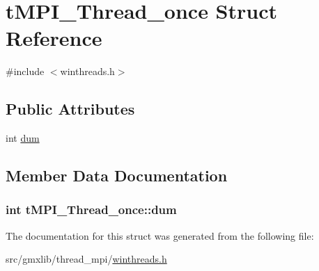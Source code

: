 \hypertarget{structtMPI__Thread__once}{\section{t\-M\-P\-I\-\_\-\-Thread\-\_\-once \-Struct \-Reference}
\label{structtMPI__Thread__once}
}


{\ttfamily \#include $<$winthreads.\-h$>$}

\subsection*{\-Public \-Attributes}
\begin{DoxyCompactItemize}
\item 
int \hyperlink{structtMPI__Thread__once_a55f970772bb7de2e901bfd10170695c4}{dum}
\end{DoxyCompactItemize}


\subsection{\-Member \-Data \-Documentation}
\hypertarget{structtMPI__Thread__once_a55f970772bb7de2e901bfd10170695c4}{
\subsubsection[{dum}]{\setlength{\rightskip}{0pt plus 5cm}int {\bf t\-M\-P\-I\-\_\-\-Thread\-\_\-once\-::dum}}}\label{structtMPI__Thread__once_a55f970772bb7de2e901bfd10170695c4}


\-The documentation for this struct was generated from the following file\-:\begin{DoxyCompactItemize}
\item 
src/gmxlib/thread\-\_\-mpi/\hyperlink{winthreads_8h}{winthreads.\-h}\end{DoxyCompactItemize}
